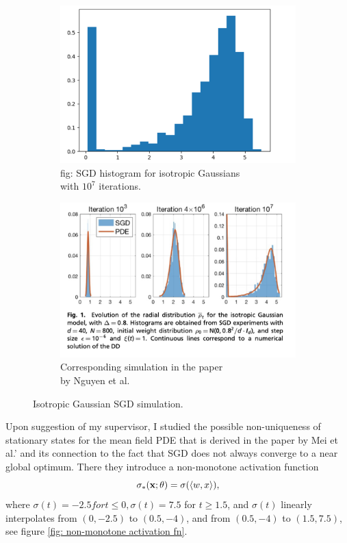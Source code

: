 \documentclass{article}
\begin{document}
\begin{figure}[H]
\begin{subfigure}{0.5\textwidth}
  \centering
  \includegraphics[width=0.8\linewidth]{ images/Nguyen2018-SGD-1.png}
  \caption{fig: SGD histogram for isotropic Gaussians\\ with $ 10^{7}$ iterations.}
  \label{fig: SGD histogram isotropic Gaussians}
\end{subfigure}%
\begin{subfigure}{0.5\textwidth}
  \centering
  \includegraphics[width=0.8\linewidth]{images/Nguyen2018-paper-numerical-validation-iso-gauss.png}
  \caption{Corresponding simulation in the paper\\ by Nguyen et al.}
  \label{fig: Nguyen 2018 isotropic Gaussian simulation}
\end{subfigure}
\caption{Isotropic Gaussian SGD simulation.}
\label{fig:  isotropic gaussians SGD}
\end{figure}


Upon suggestion of my supervisor, I studied the possible non-uniqueness of stationary states for the mean field PDE that is derived in the paper by Mei et al.’ and its connection to the fact that SGD does not always converge to a near global optimum. There they introduce a non-monotone activation function
\begin{equation}
	\sigma_*( \mathbf{x}; \mathbf{\theta})= \sigma(\langle w, x\rangle), 
\end{equation}
where $\sigma(t) = −2.5 for t \leq 0, σ(t) = 7.5$ for $t \geq 1.5$, and $\sigma(t)$ linearly
interpolates from $(0, −2.5)$ to $(0.5, −4)$, and from $(0.5, −4)$ to $(1.5, 7.5)$, see figure \ref{fig: non-monotone activation fn}.
\end{document}
